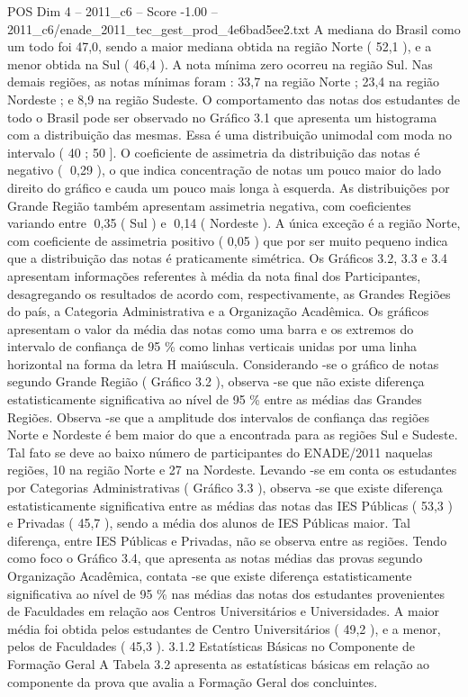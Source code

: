 \begin{textsample}{POS Dim 4 – 2011\_c6 – Score -1.00 – 2011\_c6/enade\_2011\_tec\_gest\_prod\_4e6bad5ee2.txt}
A mediana do Brasil como um todo foi 47,0, sendo a maior mediana obtida na região Norte ( 52,1 ), e a menor obtida na Sul ( 46,4 ).
A nota mínima zero ocorreu na região Sul.
Nas demais regiões, as notas mínimas foram : 33,7 na região Norte ; 23,4 na região Nordeste ; e 8,9 na região Sudeste.
O comportamento das notas dos estudantes de todo o Brasil pode ser observado no Gráfico 3.1 que apresenta um histograma com a distribuição das mesmas.
Essa é uma distribuição unimodal com moda no intervalo ( 40 ; 50 ].
O coeficiente de assimetria da distribuição das notas é negativo ( 0,29 ), o que indica concentração de notas um pouco maior do lado direito do gráfico e cauda um pouco mais longa à esquerda.
As distribuições por Grande Região também apresentam assimetria negativa, com coeficientes variando entre 0,35 ( Sul ) e 0,14 ( Nordeste ).
A única exceção é a região Norte, com coeficiente de assimetria positivo ( 0,05 ) que por ser muito pequeno indica que a distribuição das notas é praticamente simétrica.
Os Gráficos 3.2, 3.3 e 3.4 apresentam informações referentes à média da nota final dos Participantes, desagregando os resultados de acordo com, respectivamente, as Grandes Regiões do país, a Categoria Administrativa e a Organização Acadêmica.
Os gráficos apresentam o valor da média das notas como uma barra e os extremos do intervalo de confiança de 95 \% como linhas verticais unidas por uma linha horizontal na forma da letra H maiúscula.
Considerando -se o gráfico de notas segundo Grande Região ( Gráfico 3.2 ), observa -se que não existe diferença estatisticamente significativa ao nível de 95 \% entre as médias das Grandes Regiões.
Observa -se que a amplitude dos intervalos de confiança das regiões Norte e Nordeste é bem maior do que a encontrada para as regiões Sul e Sudeste.
Tal fato se deve ao baixo número de participantes do ENADE/2011 naquelas regiões, 10 na região Norte e 27 na Nordeste.
Levando -se em conta os estudantes por Categorias Administrativas ( Gráfico 3.3 ), observa -se que existe diferença estatisticamente significativa entre as médias das notas das IES Públicas ( 53,3 ) e Privadas ( 45,7 ), sendo a média dos alunos de IES Públicas maior.
Tal diferença, entre IES Públicas e Privadas, não se observa entre as regiões.
Tendo como foco o Gráfico 3.4, que apresenta as notas médias das provas segundo Organização Acadêmica, contata -se que existe diferença estatisticamente significativa ao nível de 95 \% nas médias das notas dos estudantes provenientes de Faculdades em relação aos Centros Universitários e Universidades.
A maior média foi obtida pelos estudantes de Centro Universitários ( 49,2 ), e a menor, pelos de Faculdades ( 45,3 ). 3.1.2 Estatísticas Básicas no Componente de Formação Geral A Tabela 3.2 apresenta as estatísticas básicas em relação ao componente da prova que avalia a Formação Geral dos concluintes.

\end{textsample}
